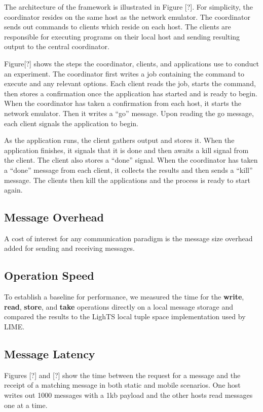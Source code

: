 \documentclass[lnicst]{svmultln}
\begin{document}
The architecture of the framework is illustrated in Figure [?]. For simplicity, the coordinator resides on the same host as the network emulator. The coordinator sends out commands to clients which reside on each host. The clients are responsible for executing programs on their local host and sending resulting output to the central coordinator.

Figure[?] shows the steps the coordinator, clients, and applications use to conduct an experiment. The coordinator first writes a job containing the command to execute and any relevant options. Each client reads the job, starts the command, then stores a confirmation once the application has started and is ready to begin. When the coordinator has taken a confirmation from each host, it starts the network emulator. Then it writes a “go” message. Upon reading the go message, each client signals the application to begin.

As the application runs, the client gathers output and stores it. When the application finishes, it signals that it is done and then awaits a kill signal from the client. The client also stores a “done” signal. When the coordinator has taken a “done” message from each client, it collects the results and then sends a “kill” message. The clients then kill the applications and the process is ready to start again.

\subsection{Message Overhead}

A cost of interest for any communication paradigm is the message size overhead added for sending and receiving messages.

\subsection{Operation Speed}

To establish a baseline for performance, we measured the time for the \textbf{write}, \textbf{read}, \textbf{store}, and \textbf{take} operations directly on a local message storage and compared the results to the LighTS local tuple space implementation used by LIME.

\subsection{Message Latency}

Figures [?] and [?] show the time between the request for a message and the receipt of a matching message in both static and mobile scenarios. One host writes out 1000 messages with a 1kb payload and the other hosts read messages one at a time.
\end{document}
